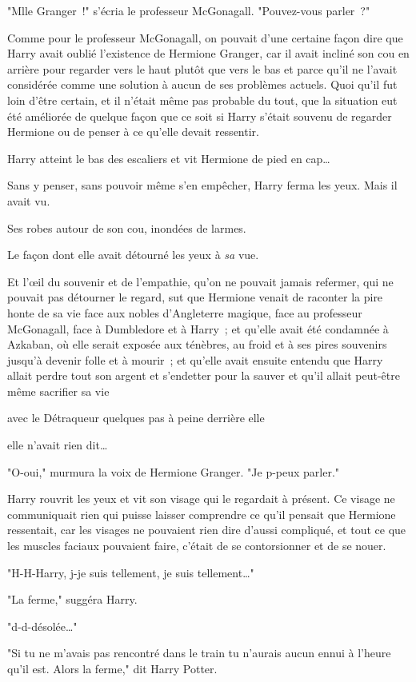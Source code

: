 "Mlle Granger~!" s'écria le professeur McGonagall. "Pouvez-vous parler~?"

Comme pour le professeur McGonagall, on pouvait d'une certaine façon dire que Harry avait oublié l'existence de Hermione Granger, car il avait incliné son cou en arrière pour regarder vers le haut plutôt que vers le bas et parce qu'il ne l'avait considérée comme une solution à aucun de ses problèmes actuels. Quoi qu'il fut loin d'être certain, et il n'était même pas probable du tout, que la situation eut été améliorée de quelque façon que ce soit si Harry s'était souvenu de regarder Hermione ou de penser à ce qu'elle devait ressentir.

Harry atteint le bas des escaliers et vit Hermione de pied en cap…

Sans y penser, sans pouvoir même s'en empêcher, Harry ferma les yeux. Mais il avait vu.

Ses robes autour de son cou, inondées de larmes.

Le façon dont elle avait détourné les yeux à \emph{sa} vue.

Et l'œil du souvenir et de l'empathie, qu'on ne pouvait jamais refermer, qui ne pouvait pas détourner le regard, sut que Hermione venait de raconter la pire honte de sa vie face aux nobles d'Angleterre magique, face au professeur McGonagall, face à Dumbledore et à Harry~; et qu'elle avait été condamnée à Azkaban, où elle serait exposée aux ténèbres, au froid et à ses pires souvenirs jusqu'à devenir folle et à mourir~; et qu'elle avait ensuite entendu que Harry allait perdre tout son argent et s'endetter pour la sauver et qu'il allait peut-être même sacrifier sa vie

avec le Détraqueur quelques pas à peine derrière elle

elle n'avait rien dit…

"O-oui," murmura la voix de Hermione Granger. "Je p-peux parler."

Harry rouvrit les yeux et vit son visage qui le regardait à présent. Ce visage ne communiquait rien qui puisse laisser comprendre ce qu'il pensait que Hermione ressentait, car les visages ne pouvaient rien dire d'aussi compliqué, et tout ce que les muscles faciaux pouvaient faire, c'était de se contorsionner et de se nouer.

"H-H-Harry, j-je suis tellement, je suis tellement…"

"La ferme," suggéra Harry.

"d-d-désolée…"

"Si tu ne m'avais pas rencontré dans le train tu n'aurais aucun ennui à l'heure qu'il est. Alors la ferme," dit Harry Potter.

